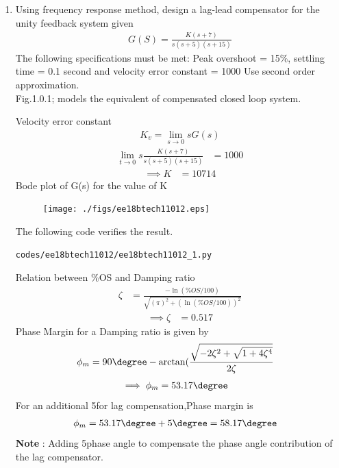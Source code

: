 \begin{enumerate}[label=\thesubsection.\arabic*.,ref=\thesubsection.\theenumi]
\item Using frequency response method, design a lag-lead compensator for the unity feedback system given \\
\begin{align}
G(S) = \frac{K(s+7)}{s(s+5)(s+15)}
\end{align}
The following specifications must be met: Peak overshoot = 15\%, settling time = 0.1 second and velocity error constant = 1000
Use second order approximation. \\
%
\solution Fig.1.0.1; models the equivalent of compensated closed loop system. 
 \begin{figure}[!ht]
	\begin{center}
		\resizebox{\columnwidth}{!}{}
	\end{center}
\caption{}
\label{fig:1;}
\end{figure}
%

Velocity error constant  
\begin{align}
K_{v} =  \lim_{s \to 0}sG(s)
\end{align}
\begin{align}
\lim_{t \to 0}s\frac{K(s+7)}{s(s+5)(s+15)} &= 1000
\end{align}
\begin{align}
\implies K &= 10714
\end{align}
Bode plot of G(s) for the value of K

\begin{figure}[!ht]
\centering
  \texttt{[image: ./figs/ee18btech11012.eps]}
\caption{}
\label{fig:ee18btech11012}
\end{figure}


The following code verifies the result.
\begin{lstlisting}
codes/ee18btech11012/ee18btech11012_1.py
\end{lstlisting}
%
Relation between \%OS and Damping ratio
\begin{align}
\zeta &= \frac{-\ln(\%OS/100)}{\sqrt{(\pi)^2 + (\ln(\%OS/100))^2}}
\end{align}
\begin{align}
\implies\zeta &= 0.517 
\end{align}
Phase Margin for a Damping ratio is given by
\begin{align}
\phi_{m} &= 90\degree - \arctan(\frac{\sqrt{-2\zeta^2+\sqrt{1+4\zeta^4}}}{2\zeta}
\end{align}
\begin{align}
\implies \phi_{m} &= 53.17\degree
\end{align}
For an additional 5\degree for lag compensation,Phase margin is
\begin{align}
    \phi_{m} &= 53.17\degree + 5\degree= 58.17\degree
\end{align}
\textbf{Note} : Adding 5\degree  phase angle to compensate the phase angle contribution of the lag compensator.\\


\end{enumerate}

